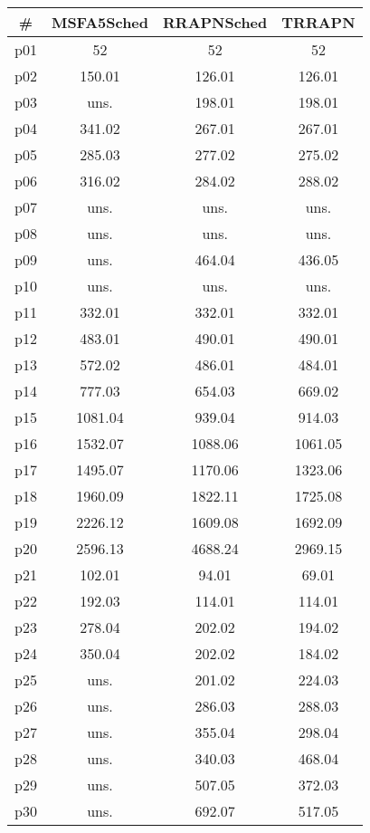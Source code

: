 \begin{tabular}{cccc}
\toprule
\textbf{\#} & \textbf{MSFA5Sched} & \textbf{RRAPNSched} & \textbf{TRRAPN}\\
\midrule
p01 & 52 & 52 & 52\\
p02 & 150.01 & 126.01 & 126.01\\
p03 & uns. & 198.01 & 198.01\\
p04 & 341.02 & 267.01 & 267.01\\
p05 & 285.03 & 277.02 & 275.02\\
p06 & 316.02 & 284.02 & 288.02\\
p07 & uns. & uns. & uns.\\
p08 & uns. & uns. & uns.\\
p09 & uns. & 464.04 & 436.05\\
p10 & uns. & uns. & uns.\\
p11 & 332.01 & 332.01 & 332.01\\
p12 & 483.01 & 490.01 & 490.01\\
p13 & 572.02 & 486.01 & 484.01\\
p14 & 777.03 & 654.03 & 669.02\\
p15 & 1081.04 & 939.04 & 914.03\\
p16 & 1532.07 & 1088.06 & 1061.05\\
p17 & 1495.07 & 1170.06 & 1323.06\\
p18 & 1960.09 & 1822.11 & 1725.08\\
p19 & 2226.12 & 1609.08 & 1692.09\\
p20 & 2596.13 & 4688.24 & 2969.15\\
p21 & 102.01 & 94.01 & 69.01\\
p22 & 192.03 & 114.01 & 114.01\\
p23 & 278.04 & 202.02 & 194.02\\
p24 & 350.04 & 202.02 & 184.02\\
p25 & uns. & 201.02 & 224.03\\
p26 & uns. & 286.03 & 288.03\\
p27 & uns. & 355.04 & 298.04\\
p28 & uns. & 340.03 & 468.04\\
p29 & uns. & 507.05 & 372.03\\
p30 & uns. & 692.07 & 517.05\\
\bottomrule
\end{tabular}

